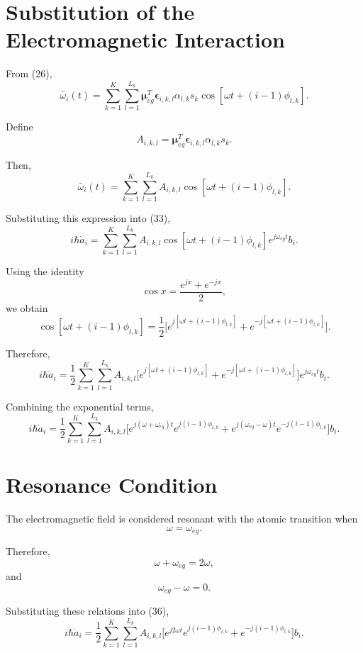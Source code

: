 \documentclass[12pt,a4paper]{article}
\begin{document}
\section{Substitution of the Electromagnetic Interaction}

From (26),
\[
\bar{\omega}_i(t)
=
\sum_{k=1}^{K}
\sum_{l=1}^{L_k}
\boldsymbol{\mu}_{eg}^{T}
\boldsymbol{\epsilon}_{i,k,l}
\alpha_{l,k}s_k
\cos
\left[
\omega t+(i-1)\phi_{l,k}
\right].
\]

Define
\begin{equation}
\boxed{
A_{i,k,l}
=
\boldsymbol{\mu}_{eg}^{T}
\boldsymbol{\epsilon}_{i,k,l}
\alpha_{l,k}s_k.
}
\tag{35}
\end{equation}

Then,
\[
\bar{\omega}_i(t)
=
\sum_{k=1}^{K}
\sum_{l=1}^{L_k}
A_{i,k,l}
\cos
\left[
\omega t+(i-1)\phi_{l,k}
\right].
\]

Substituting this expression into (33),
\[
i\hbar\dot a_i
=
\sum_{k=1}^{K}
\sum_{l=1}^{L_k}
A_{i,k,l}
\cos
\left[
\omega t+(i-1)\phi_{l,k}
\right]
e^{j\omega_{eg}t}
b_i.
\]

Using the identity
\[
\cos x
=
\frac{e^{jx}+e^{-jx}}{2},
\]
we obtain
\[
\cos
\left[
\omega t+(i-1)\phi_{l,k}
\right]
=
\frac{1}{2}
\Big[
e^{j[\omega t+(i-1)\phi_{l,k}]}
+
e^{-j[\omega t+(i-1)\phi_{l,k}]}
\Big].
\]

Therefore,
\[
i\hbar\dot a_i
=
\frac{1}{2}
\sum_{k=1}^{K}
\sum_{l=1}^{L_k}
A_{i,k,l}
\Big[
e^{j[\omega t+(i-1)\phi_{l,k}]}
+
e^{-j[\omega t+(i-1)\phi_{l,k}]}
\Big]
e^{j\omega_{eg}t}
b_i.
\]

Combining the exponential terms,
\begin{equation}
i\hbar\dot a_i
=
\frac{1}{2}
\sum_{k=1}^{K}
\sum_{l=1}^{L_k}
A_{i,k,l}
\Big[
e^{j(\omega+\omega_{eg})t}
e^{j(i-1)\phi_{l,k}}
+
e^{j(\omega_{eg}-\omega)t}
e^{-j(i-1)\phi_{l,k}}
\Big]
b_i.
\tag{36}
\end{equation}


\section{Resonance Condition}

The electromagnetic field is considered resonant with the atomic
transition when
\[
\boxed{
\omega=\omega_{eg}.
}
\tag{37}
\]

Therefore,
\[
\omega+\omega_{eg}=2\omega,
\]
and
\[
\omega_{eg}-\omega=0.
\]

Substituting these relations into (36),
\begin{equation}
i\hbar\dot a_i
=
\frac{1}{2}
\sum_{k=1}^{K}
\sum_{l=1}^{L_k}
A_{i,k,l}
\Big[
e^{j2\omega t}
e^{j(i-1)\phi_{l,k}}
+
e^{-j(i-1)\phi_{l,k}}
\Big]
b_i.
\tag{38}
\end{equation}
\end{document}
